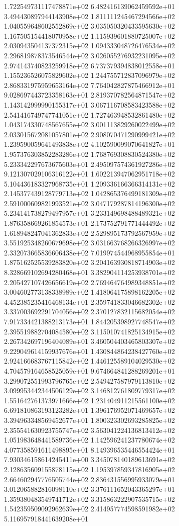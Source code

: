 1.722549731117478871e+02 6.482416139062459592e+01 3.494430897944143908e+02
1.811111245467294566e+02 1.040559648602552869e+02 3.035050320433595630e+02
1.167505154418070958e+02 1.115939601880725007e+02 2.030943504137372315e+02
1.094333048726476534e+02 2.296819878373546544e+02 3.026055276932231095e+02
2.974143740823259918e+02 6.737379394838012558e+01 1.155236526075829602e+02
1.244755712837096979e+02 2.868331975959653164e+02 7.764042827875466912e+01
9.028697443723358163e+01 2.819370782564871547e+02 1.143142999990155317e+01
3.067116708583423588e+02 2.541416749747741051e+02 1.727463948532861480e+02
1.043174330748567655e+02 3.001113829260022499e+02 2.033015672081057801e+02
2.908070471290999421e+02 1.239590059641493838e+02 4.102590099070641827e+01
1.957376303852283286e+02 1.768769308830524380e+02 5.233342297673675603e+01
2.495097574361927286e+02 9.121307029106316122e+01 1.602213947062951718e+02
5.104436183327968735e+01 1.209336166366314131e+02 2.145377439128779713e+02
1.042865376499181309e+02 2.591000609821993521e+02 3.047179287814196300e+02
5.234141738279497957e+01 3.233149698488489321e+02 1.876358669261854573e+01
2.173752791771444492e+02 1.618948247041362833e+02 2.529895173792567959e+02
3.551925348260679698e+02 3.031663768266326997e+02 2.332073665836606438e+02
7.019974544968955854e+01 1.875162525539283820e+02 3.204163930818714903e+02
8.328669102694280468e+01 3.382904114253938701e+02 2.205427107426656619e+02
2.769464764989348851e+02 3.004602773138338989e+02 1.418064175898162205e+02
4.452385235416468134e+01 2.359741833046682302e+02 3.337003692291704056e+02
2.370127832115682054e+02 7.917334421388213173e+01 1.844205398927748547e+02
2.395519882704084580e+02 3.115010741825134915e+02 2.267342697196404089e+01
3.460504403465803307e+02 9.229049614159937676e+01 1.430844864238427760e+02
2.924166683767115842e+02 1.446125589104029530e+02 4.704579164658525059e+01
9.674664841288269201e+01 3.299072551993796765e+02 2.549427587979113810e+02
3.099953442344506129e+02 3.146812761809779317e+02 1.551642761373971666e+02
1.231404911215561100e+02 6.691810863193123282e+01 1.396176952071469657e+02
3.394963348569452677e+01 1.800323302693285825e+02 2.355541630923755747e+02
3.563041224136813412e+02 1.051983648441589736e+02 1.142596241237780674e+02
4.077358591611498895e+01 8.149396535446554424e+01 7.930346158614245411e+00
3.345078140189613691e+02 2.128635609155878115e+02 1.195397859347816905e+02
2.664602947776505744e+02 2.836431556995933079e+01 3.012065882816098110e+02
3.376111652043365297e+01 1.359380483549741712e+02 3.315863222907535715e+02
1.542359509092962639e+02 2.414957774598591982e+02 5.116957918441639208e+01
